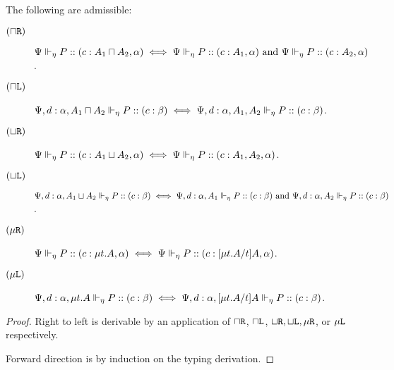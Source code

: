 \begin{lemma}[Invertibility]
  \label{algorithmic:property-invertible}
  The following are admissible:
  \begin{description}
    \item[$(\mathbin{\sqcap}\texttt{R})$] ${\Psi} \Vdash_{\eta} P :: (c : A_1 \mathbin{\sqcap} A_2, \alpha) \iff {\Psi} \Vdash_{\eta} P :: (c : A_1, \alpha) \text{ and } {\Psi} \Vdash_{\eta} P :: (c : A_2, \alpha)$.
    \item[$(\mathbin{\sqcap}\texttt{L})$] ${\Psi, d : \alpha, A_1 \mathbin{\sqcap} A_2} \Vdash_{\eta} P :: (c : \beta) \iff {\Psi, d : \alpha, A_1, A_2} \Vdash_{\eta} P :: (c : \beta)$.

    \item[$(\mathbin{\sqcup}\texttt{R})$] ${\Psi} \Vdash_{\eta} P :: (c : A_1 \mathbin{\sqcup} A_2, \alpha) \iff {\Psi} \Vdash_{\eta} P :: (c : A_1, A_2, \alpha)$.
    \item[$(\mathbin{\sqcup}\texttt{L})$] ${\Psi, d : \alpha, A_1 \mathbin{\sqcup} A_2} \Vdash_{\eta} P :: (c : \beta) \iff
    {\Psi, d : \alpha, A_1} \Vdash_{\eta} P :: (c : \beta)
    \text{ and } {\Psi, d : \alpha, A_2} \Vdash_{\eta} P :: (c : \beta)$.

    \item[$(\mu\texttt{R})$] ${\Psi} \Vdash_{\eta} P :: (c : \mu{t} . {A}, \alpha) \iff {\Psi} \Vdash_{\eta} P :: (c : \lbrack{\mu{t} . {A}}/{t}\rbrack{A}, \alpha)$.
    \item[$(\mu\texttt{L})$] ${\Psi, d : \alpha, \mu{t} . {A}} \Vdash_{\eta} P :: (c : \beta) \iff
    {\Psi, d : \alpha, \lbrack{\mu{t} . {A}}/{t}\rbrack{A}} \Vdash_{\eta} P :: (c : \beta)$.
  \end{description}
\end{lemma}
\begin{proof}
  Right to left is derivable by an application of $\mathbin{\sqcap}\texttt{R}$, $\mathbin{\sqcap}\texttt{L}$, $\mathbin{\sqcup}\texttt{R}, \mathbin{\sqcup}\texttt{L}, \mu\texttt{R}$, or $\mu\texttt{L}$ respectively.

  Forward direction is by induction on the typing derivation. 
\end{proof}

